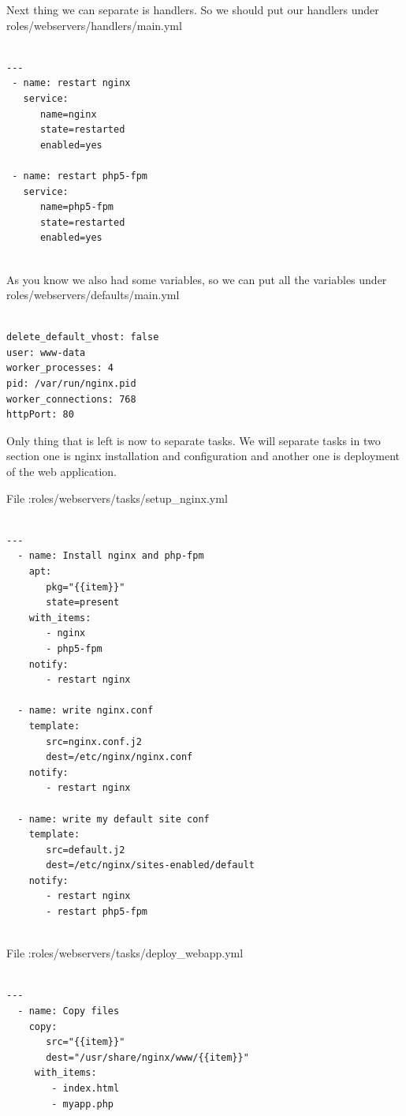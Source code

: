 \documentclass[10pt]{book}
\begin{document}
Next thing we can separate is handlers. So we should put our handlers under roles/webservers/handlers/main.yml


\begin{Verbatim} 
 
---
 - name: restart nginx
   service: 
      name=nginx
      state=restarted
      enabled=yes

 - name: restart php5-fpm 
   service: 
      name=php5-fpm 
      state=restarted
      enabled=yes
      
\end{Verbatim}  

As you know we also had some variables, so we can put all the variables under roles/webservers/defaults/main.yml

\begin{Verbatim} 
 
delete_default_vhost: false
user: www-data
worker_processes: 4 
pid: /var/run/nginx.pid
worker_connections: 768
httpPort: 80

\end{Verbatim}  


Only thing that is left is now to separate tasks. We will separate tasks in two 
section one is nginx installation and configuration and another one is 
deployment of the web application.

File :roles/webservers/tasks/setup\_nginx.yml
\begin{Verbatim} 
 
---
  - name: Install nginx and php-fpm 
    apt: 
       pkg="{{item}}"
       state=present
    with_items:
       - nginx
       - php5-fpm
    notify:
       - restart nginx

  - name: write nginx.conf
    template: 
       src=nginx.conf.j2
       dest=/etc/nginx/nginx.conf
    notify:
       - restart nginx

  - name: write my default site conf
    template: 
       src=default.j2
       dest=/etc/nginx/sites-enabled/default
    notify: 
       - restart nginx
       - restart php5-fpm
      
\end{Verbatim}  


File :roles/webservers/tasks/deploy\_webapp.yml
\begin{Verbatim} 
 
---
  - name: Copy files
    copy: 
       src="{{item}}"
       dest="/usr/share/nginx/www/{{item}}"
     with_items:
        - index.html 
        - myapp.php
      
\end{Verbatim} 
\end{document}
